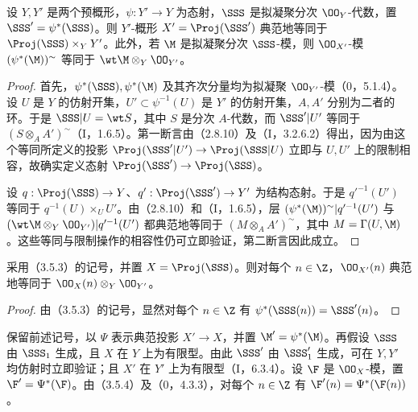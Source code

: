 设 $Y,Y'$ 是两个预概形，$\psi:Y'\to Y$ 为态射，$\SSS$ 是拟凝聚分次 $\OO_Y$-代数，置 $\SSS'=\psi^*(\SSS)$。则 $Y'$-概形 $X'=\Proj(\SSS')$ 典范地等同于 $\Proj(\SSS)\times_Y Y'$。此外，若 $\M$ 是拟凝聚分次 $\SSS$-模，则 $\OO_{X'}$-模 $(\psi^*(\M))^\sim$ 等同于 $\wt\M\otimes_Y\OO_{Y'}$。
\begin{proof}
首先，$\psi^*(\SSS),\psi^*(\M)$ 及其齐次分量均为拟凝聚 $\OO_{Y'}$-模（0，5.1.4）。设 $U$ 是 $Y$ 的仿射开集，$U'\subset\psi^{-1}(U)$ 是 $Y'$ 的仿射开集，$A,A'$ 分别为二者的环。于是 $\SSS|U=\wt S$，其中 $S$ 是分次 $A$-代数，而 $\SSS'|U'$ 等同于 $(S\otimes_A A')^\sim$（I，1.6.5）。第一断言由（2.8.10）及（I，3.2.6.2）得出，因为由这个等同所定义的投影
$\Proj(\SSS'|U')\to\Proj(\SSS|U)$ 立即与 $U,U'$ 上的限制相容，故确实定义态射 $\Proj(\SSS')\to\Proj(\SSS)$。

设 $q:\Proj(\SSS)\to Y$、$q':\Proj(\SSS')\to Y'$ 为结构态射。于是 $q'^{-1}(U')$ 等同于 $q^{-1}(U)\times_U U'$。由（2.8.10）和（I，1.6.5），层
$(\psi^*(\M))^\sim|q'^{-1}(U')$ 与
$(\wt\M\otimes_Y\OO_{Y'})|q'^{-1}(U')$ 都典范地等同于 $(M\otimes_A A')^\sim$，其中 $M=\Gamma(U,\M)$。这些等同与限制操作的相容性仍可立即验证，第二断言因此成立。
\end{proof}

采用（3.5.3）的记号，并置 $X=\Proj(\SSS)$。则对每个 $n\in\Z$，$\OO_{X'}(n)$ 典范地等同于 $\OO_X(n)\otimes_Y\OO_{Y'}$。
\begin{proof}
由（3.5.3）的记号，显然对每个 $n\in\Z$ 有 $\psi^*(\SSS(n))=\SSS'(n)$。
\end{proof}

保留前述记号，以 $\Psi$ 表示典范投影 $X'\to X$，并置 $\M'=\psi^*(\M)$。再假设 $\SSS$ 由 $\SSS_1$ 生成，且 $X$ 在 $Y$ 上为有限型。由此 $\SSS'$ 由 $\SSS'_1$ 生成，可在 $Y,Y'$ 均仿射时立即验证；且 $X'$ 在 $Y'$ 上为有限型（I，6.3.4）。设 $\F$ 是 $\OO_X$-模，置 $\F'=\Psi^*(\F)$。由（3.5.4）及（0，4.3.3），对每个 $n\in\Z$ 有 $\F'(n)=\Psi^*(\F(n))$。

